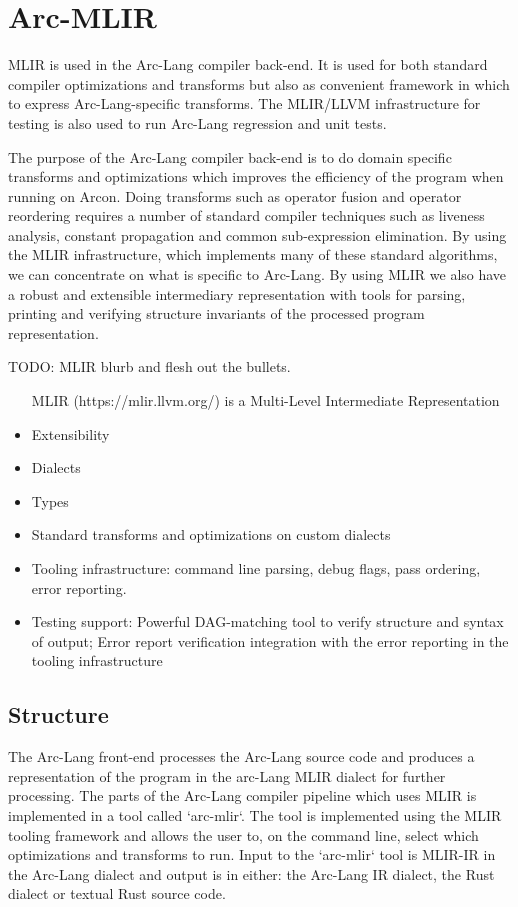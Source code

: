 \section{Arc-MLIR}

MLIR is used in the Arc-Lang compiler back-end. It is used for both standard compiler optimizations and transforms but also as convenient framework in which to express Arc-Lang-specific transforms. The MLIR/LLVM infrastructure for testing is also used to run Arc-Lang regression and unit tests.

The purpose of the Arc-Lang compiler back-end is to do domain specific transforms and optimizations which improves the efficiency of the program when running on Arcon. Doing transforms such as operator fusion and operator reordering requires a number of standard compiler techniques such as liveness analysis, constant propagation and common sub-expression elimination. By using the MLIR infrastructure, which implements many of these standard algorithms, we can concentrate on what is specific to Arc-Lang. By using MLIR we also have a robust and extensible intermediary representation with tools for parsing, printing and verifying structure invariants of the processed program representation.

TODO: MLIR blurb and flesh out the bullets.

\begin{itemize}
  \item [MLIR](https://mlir.llvm.org/) is a Multi-Level Intermediate Representation
  \item Extensibility
  \item Dialects
  \item Types
  \item Standard transforms and optimizations on custom dialects
  \item Tooling infrastructure: command line parsing, debug flags, pass ordering, error reporting.
  \item Testing support: Powerful DAG-matching tool to verify structure and syntax of output; Error report verification integration with the error reporting in the tooling infrastructure
\end{itemize}

\subsection{Structure}

The Arc-Lang front-end processes the Arc-Lang source code and produces a representation of the program in the arc-Lang MLIR dialect for further processing. The parts of the Arc-Lang compiler pipeline which uses MLIR is implemented in a tool called `arc-mlir`. The tool is implemented using the MLIR tooling framework and allows the user to, on the command line, select which optimizations and transforms to run. Input to the `arc-mlir` tool is MLIR-IR in the Arc-Lang dialect and output is in either: the Arc-Lang IR dialect, the Rust dialect or textual Rust source code.


